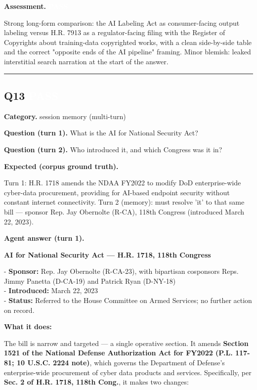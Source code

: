 \documentclass[11pt]{article}
\newcommand{\fieldlabel}[1]{\textbf{\color{navy}#1}\quad}
\begin{document}
\fieldlabel{Assessment.} \colorbox{passgreen}{\textcolor{white}{\bfseries PASS}}\par
Strong long-form comparison: the AI Labeling Act as consumer-facing output labeling versus H.R. 7913 as a regulator-facing filing with the Register of Copyrights about training-data copyrighted works, with a clean side-by-side table and the correct "opposite ends of the AI pipeline" framing. Minor blemish: leaked interstitial search narration at the start of the answer.
\vspace{4pt}\hrule\vspace{8pt}
\subsection*{Q13 \quad \colorbox{passgreen}{\textcolor{white}{\bfseries PASS}}}
\fieldlabel{Category.} session memory (multi-turn)\par
\fieldlabel{Question (turn 1).} What is the AI for National Security Act?\par
\fieldlabel{Question (turn 2).} Who introduced it, and which Congress was it in?\par
\fieldlabel{Expected (corpus ground truth).}\par
Turn 1: H.R. 1718 amends the NDAA FY2022 to modify DoD enterprise-wide cyber-data procurement, providing for AI-based endpoint security without constant internet connectivity. Turn 2 (memory): must resolve 'it' to that same bill --- sponsor Rep. Jay Obernolte (R-CA), 118th Congress (introduced March 22, 2023).

\fieldlabel{Agent answer (turn 1).}\par
\textbf{AI for National Security Act --- H.R. 1718, 118th Congress}

- \textbf{Sponsor:} Rep. Jay Obernolte (R-CA-23), with bipartisan cosponsors Reps. Jimmy Panetta (D-CA-19) and Patrick Ryan (D-NY-18) \\
- \textbf{Introduced:} March 22, 2023 \\
- \textbf{Status:} Referred to the House Committee on Armed Services; no further action on record.

\textbf{What it does:}

The bill is narrow and targeted --- a single operative section. It amends \textbf{Section 1521 of the National Defense Authorization Act for FY2022 (P.L. 117-81; 10 U.S.C. 2224 note)}, which governs the Department of Defense's enterprise-wide procurement of cyber data products and services. Specifically, per \textbf{Sec. 2 of H.R. 1718, 118th Cong.}, it makes two changes:
\end{document}
